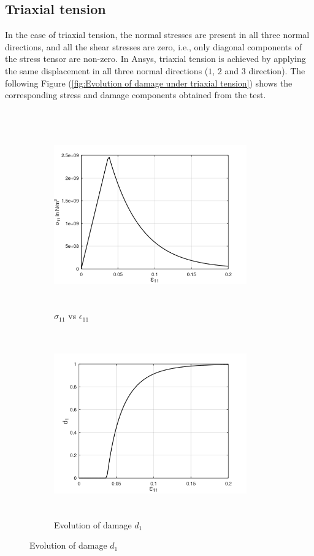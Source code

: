 \documentclass[12pt,a4paper,twoside,openright]{report}
\begin{document}
 \subsection{Triaxial tension}
\indent\indent\indent In the case of triaxial tension, the normal stresses are present in all three normal directions, and all the shear stresses are zero, i.e., only diagonal components of the stress tensor are non-zero.  In Ansys, triaxial tension is achieved by applying the same displacement in all three normal directions ($1$, $2$ and $3$ direction). The following Figure (\ref{fig:Evolution of damage under triaxial tension}) shows the corresponding stress and damage components obtained from the test.\\\\

\begin{figure}[htbp!]
       \captionsetup[subfigure]{justification=centering}
     \begin{subfigure}{0.4\textwidth}
         \includegraphics[width=8.3cm,height=8cm,keepaspectratio]{24.S11vsE11.png}
         \caption{$\sigma_{11}$ vs $\epsilon_{11}$}
         \label{fig:S11vsE11 2}
     \end{subfigure}
     \hspace{1.8cm}
     \captionsetup[subfigure]{justification=centering}
     \begin{subfigure}{0.4\textwidth}
         \includegraphics[width=8.3cm,height=8cm,keepaspectratio]{24.d1.png}
         \caption{Evolution of damage $d_{1}$}
         \label{fig:Evolution of damage d1 2}
     \end{subfigure}
\end{figure}
\end{document}
